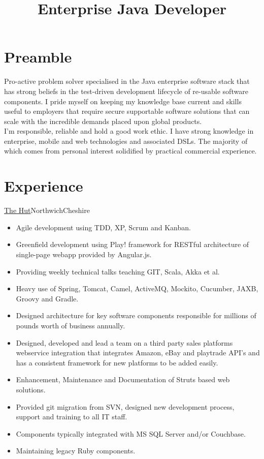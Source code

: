 \documentclass[a4paper,10pt]{moderncv}
\title{Enterprise Java Developer}
\newcommand\weblink[2] {{\color{href} \href{#1}{#2}}}
\begin{document}
\maketitle

\section{Preamble}
Pro-active problem solver specialised in the Java enterprise software stack that has strong beliefs in the test-driven development lifecycle of re-usable software components.
I pride myself on keeping my knowledge base current and skills useful to employers that require secure supportable software solutions that can scale with the incredible demands placed upon global products.\\

I'm responsible, reliable and hold a good work ethic.
I have strong knowledge in enterprise, mobile and web technologies and associated DSLs. The majority of which comes from personal interest solidified by practical commercial experience.

\section{Experience}

{\weblink{http://www.thehutgroup.com}{The Hut}}{Northwich}{Cheshire}{
\begin{itemize}
  \item Agile development using TDD, XP, Scrum and Kanban.
  \item Greenfield development using Play! framework for RESTful architecture of single-page webapp provided by Angular.js.
  \item Providing weekly technical talks teaching GIT, Scala, Akka et al.
  \item Heavy use of Spring, Tomcat, Camel, ActiveMQ, Mockito, Cucumber, JAXB, Groovy and Gradle.
  \item Designed architecture for key software components responsible for millions of pounds worth of business annually.
  \item Designed, developed and lead a team on a third party sales platforms webservice integration that integrates Amazon, eBay and playtrade API's and has a consistent framework for new platforms to be added easily.
  \item Enhancement, Maintenance and Documentation of Struts based web solutions.
  \item Provided git migration from SVN, designed new development process, support and training to all IT staff.
  \item Components typically integrated with MS SQL Server and/or Couchbase.
  \item Maintaining legacy Ruby components.
\end{itemize}
}
\end{document}
